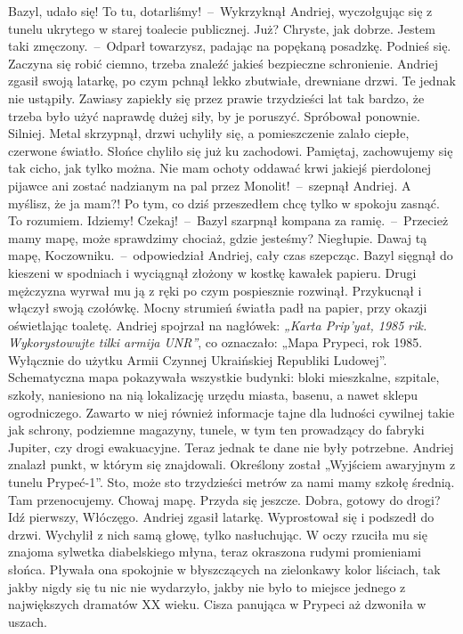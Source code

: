 \documentclass[../MAIN.tex]{subfiles}
\begin{document}
% 
\sx Bazyl, udało się! To tu, dotarliśmy!~--~Wykrzyknął Andriej, wyczołgując się z tunelu ukrytego w starej toalecie publicznej.
\xx Już? Chryste, jak dobrze. Jestem taki zmęczony.~--~Odparł towarzysz, padając na popękaną posadzkę.
\xx Podnieś się. Zaczyna się robić ciemno, trzeba znaleźć jakieś bezpieczne schronienie.
\qd
Andriej zgasił swoją latarkę, po czym pchnął lekko zbutwiałe, drewniane drzwi. Te jednak nie ustąpiły. Zawiasy zapiekły się przez prawie trzydzieści lat tak bardzo, że trzeba było użyć naprawdę dużej siły, by je poruszyć. Spróbował ponownie. Silniej. Metal skrzypnął, drzwi uchyliły się, a pomieszczenie zalało ciepłe, czerwone światło. Słońce chyliło się już ku zachodowi.
\sx
Pamiętaj, zachowujemy się tak cicho, jak tylko można. Nie mam ochoty oddawać krwi jakiejś pierdolonej pijawce ani zostać nadzianym na pal przez Monolit!~--~szepnął Andriej.
\xx A myślisz, że ja mam?! Po tym, co dziś przeszedłem chcę tylko w spokoju zasnąć.
\xx To rozumiem. Idziemy!
\xx Czekaj!~--~Bazyl szarpnął kompana za ramię.~--~Przecież mamy mapę, może sprawdzimy chociaż, gdzie jesteśmy?
\xx Niegłupie. Dawaj tą mapę, Koczowniku.~--~odpowiedział Andriej, cały czas szepcząc.
\qm
Bazyl sięgnął do kieszeni w spodniach i wyciągnął złożony w kostkę kawałek papieru. Drugi mężczyzna wyrwał mu ją z ręki po czym pospiesznie rozwinął. Przykucnął i włączył swoją czołówkę. Mocny strumień światła padł na papier, przy okazji oświetlając toaletę. Andriej spojrzał na nagłówek: \textit{„Karta Prip’yat, 1985 rik. Wykorystowujte tilki armija UNR”}, co oznaczało: „Mapa Prypeci, rok 1985. Wyłącznie do użytku Armii Czynnej Ukraińskiej Republiki Ludowej”. Schematyczna mapa pokazywała wszystkie budynki: bloki mieszkalne, szpitale, szkoły, naniesiono na nią lokalizację urzędu miasta, basenu, a nawet sklepu ogrodniczego. Zawarto w niej również informacje tajne dla ludności cywilnej takie jak schrony, podziemne magazyny, tunele, w tym ten prowadzący do fabryki Jupiter, czy drogi ewakuacyjne. Teraz jednak te dane nie były potrzebne. Andriej znalazł punkt, w którym się znajdowali. Określony został „Wyjściem awaryjnym z tunelu Prypeć-1”.
\sx
Sto, może sto trzydzieści metrów za nami mamy szkołę średnią. Tam przenocujemy. Chowaj mapę. Przyda się jeszcze.
\xx Dobra, gotowy do drogi? Idź pierwszy, Włóczęgo.
\qd
Andriej zgasił latarkę. Wyprostował się i podszedł do drzwi. Wychylił z nich samą głowę, tylko nasłuchując. W oczy rzuciła mu się znajoma sylwetka diabelskiego młyna, teraz okraszona rudymi promieniami słońca. Pływała ona spokojnie w błyszczących na zielonkawy kolor liściach, tak jakby nigdy się tu nic nie wydarzyło, jakby nie było to miejsce jednego z największych dramatów XX wieku. Cisza panująca w Prypeci aż dzwoniła w uszach.
\end{document}
